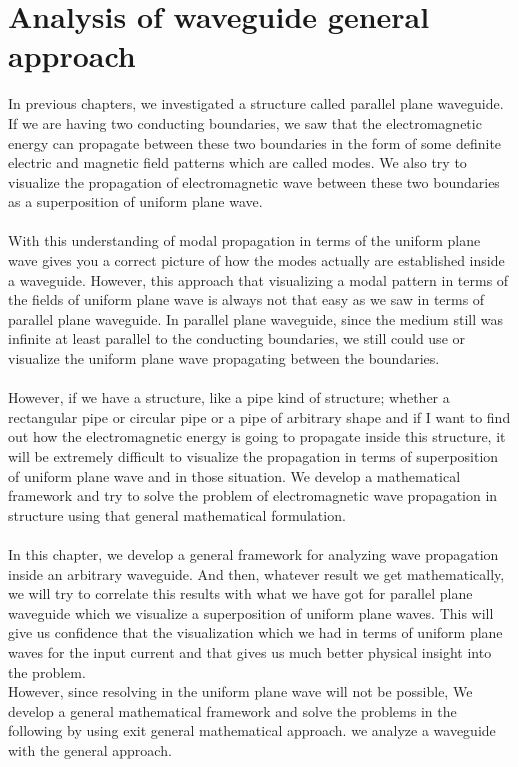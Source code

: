\chapter{Analysis of waveguide general approach}

In previous chapters, we investigated a structure called parallel plane waveguide. If we are having two conducting boundaries, we saw that the electromagnetic energy can propagate between these two boundaries in the form of some definite electric and magnetic field patterns which are called modes. We also try to visualize the propagation of electromagnetic wave between these two boundaries as a superposition of uniform plane wave.\\
\\

With this understanding of modal propagation in terms of the uniform plane wave gives you a correct picture of how the modes actually are established inside a waveguide. However, this approach that visualizing a modal pattern in terms of the fields of uniform plane wave is always not that easy as we saw in terms of parallel plane waveguide. In parallel plane waveguide, since the medium still was infinite at least parallel to the conducting boundaries, we still could use or visualize the uniform plane wave propagating between the boundaries.\\
\\

However, if we have a structure, like a pipe kind of structure; whether a rectangular pipe or circular pipe or a pipe of arbitrary shape and if I want to find out how the electromagnetic energy is going to propagate inside this structure, it will be extremely difficult to visualize the propagation in terms of superposition of uniform plane wave and in those situation. We develop a mathematical framework and try to solve the problem of electromagnetic wave propagation in structure using that general mathematical formulation.\\
\\

In this chapter, we develop a general framework for analyzing wave propagation inside an arbitrary waveguide. And then, whatever result we get mathematically, we will try to correlate this results with what we have got for parallel plane waveguide which we visualize a superposition of uniform plane waves. This will give us confidence that the visualization which we had in terms of uniform plane waves for the input current and that gives us much better physical insight into the problem.\\
However, since resolving in the uniform plane wave will not be possible, We develop a general mathematical framework and solve the problems in the following by using exit general mathematical approach. we analyze a waveguide with the general approach. 
\\
\\

